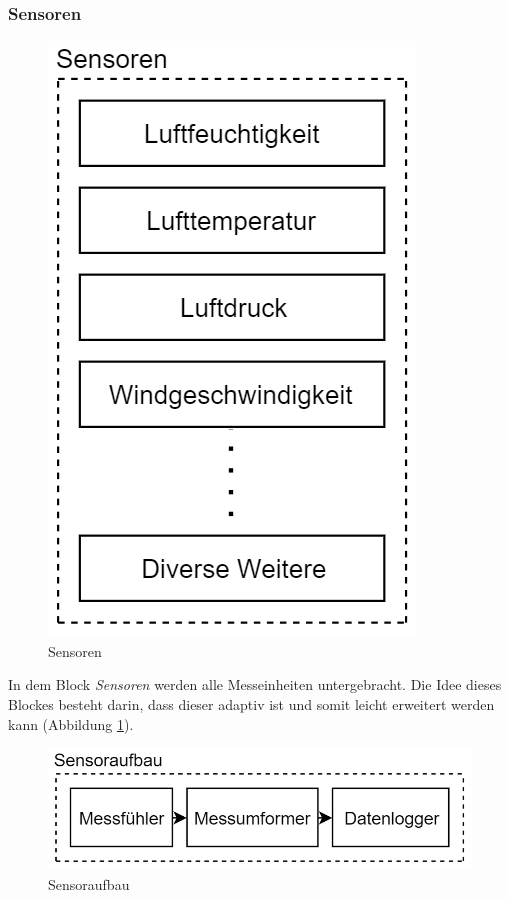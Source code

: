\subsubsection{Sensoren}
\begin{figure}[h]
\centering
\includegraphics[scale=0.8]{graphics/Sensoren.PNG}
\caption{Sensoren}
\label{fig:sensoren}
\end{figure}
In dem Block \textit{Sensoren} werden alle Messeinheiten untergebracht. Die Idee dieses Blockes besteht darin, dass dieser adaptiv ist und somit leicht erweitert werden kann (Abbildung \ref{fig:sensoren}).\\

\begin{figure}[h]
\centering
\includegraphics[scale=0.7]{graphics/Sensoraufbau.PNG}
\caption{Sensoraufbau}
\label{fig:sensoraufbau}
\end{figure}

